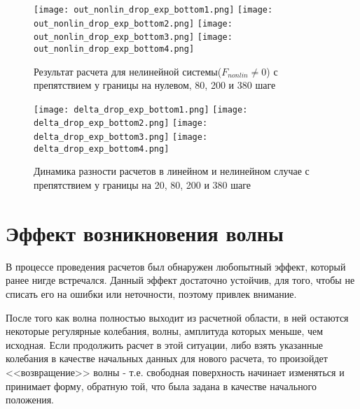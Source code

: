 \newpage
\begin{figure}[htp]
    \centering
    \vspace{12em}
    \texttt{[image: out\_nonlin\_drop\_exp\_bottom1.png]}
    \texttt{[image: out\_nonlin\_drop\_exp\_bottom2.png]}
    \texttt{[image: out\_nonlin\_drop\_exp\_bottom3.png]}
    \texttt{[image: out\_nonlin\_drop\_exp\_bottom4.png]}
    \caption{Результат расчета для нелинейной системы($F_{nonlin}\neq 0$) с препятствием у границы на нулевом, 80, 200 и 380 шаге}
    \label{fig:ExpWaveNonLin}
\end{figure}

\newpage
\begin{figure}[htp]
    \centering
    \vspace{12em}
    \texttt{[image: delta\_drop\_exp\_bottom1.png]}
    \texttt{[image: delta\_drop\_exp\_bottom2.png]}
    \texttt{[image: delta\_drop\_exp\_bottom3.png]}
    \texttt{[image: delta\_drop\_exp\_bottom4.png]}
    \caption{Динамика разности расчетов в линейном и нелинейном случае с препятствием у границы на 20, 80, 200 и 380 шаге}
    \label{fig:ExpWaveDelta}
\end{figure}

\newpage
\addtocounter{section}{1}
\setcounter{subsection}{0}
\setcounter{equation}{0}
\section*{Эффект возникновения волны}

В процессе проведения расчетов был обнаружен любопытный эффект, который ранее нигде встречался. Данный эффект достаточно устойчив, для того, чтобы не списать его на ошибки или неточности, поэтому привлек внимание.

После того как волна полностью выходит из расчетной области, в ней остаются некоторые регулярные колебания, волны, амплитуда которых меньше, чем исходная. Если продолжить расчет в этой ситуации, либо взять указанные колебания в качестве начальных данных для нового расчета, то произойдет <<возвращение>> волны - т.е. свободная поверхность начинает изменяться и принимает форму, обратную той, что была задана в качестве начального положения.

